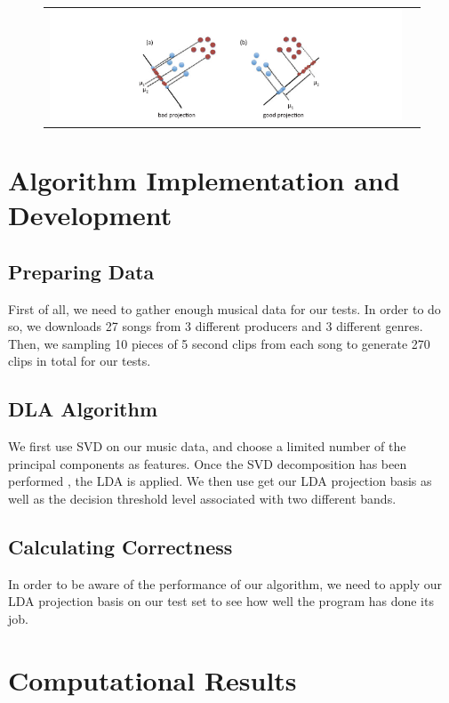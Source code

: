 \documentclass[12pt]{article}
\begin{document}
\begin{figure}[H]
\begin{tabular}{cc}
  \includegraphics[width=\textwidth]{lda.png}
\end{tabular}
\end{figure}
\section{Algorithm Implementation and Development}
\subsection{Preparing Data}
First of all, we need to gather enough musical data for our tests. In order to do so, we downloads 27 songs from 3 different producers and 3 different genres. Then, we sampling 10 pieces of 5 second clips from each song to generate 270 clips in total for our tests.
\subsection{DLA Algorithm}
We first use SVD on our music data, and choose a limited number of the principal components as features. Once the SVD decomposition has been performed , the LDA is applied. We then use get our LDA projection basis as well as the decision threshold level associated with two different bands.
\subsection{Calculating Correctness}
In order to be aware of the performance of our algorithm, we need to apply our LDA projection basis on our test set to see how well the program has done its job.
\section{Computational Results}
\end{document}
